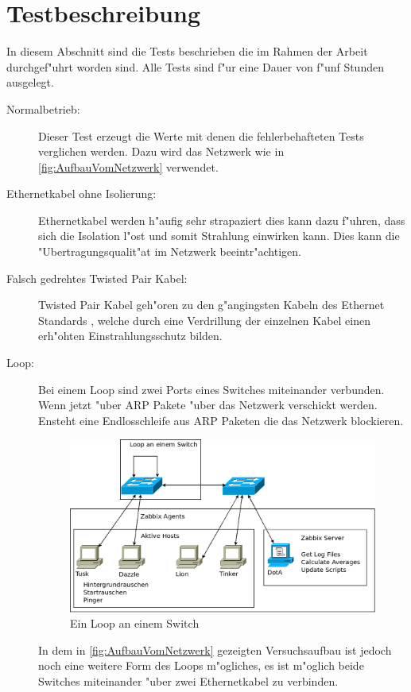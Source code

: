 \section{Testbeschreibung}
\label{sec:testbeschreibung}
In diesem Abschnitt sind die Tests beschrieben die im Rahmen der Arbeit durchgef"uhrt worden sind. %
Alle Tests sind f"ur eine Dauer von f"unf Stunden ausgelegt.  %
\begin{description}
\item[Normalbetrieb:]Dieser Test erzeugt die Werte mit denen die fehlerbehafteten %
Tests verglichen werden. Dazu wird das Netzwerk wie in \cref{fig:AufbauVomNetzwerk} %
verwendet. 
\item[Ethernetkabel ohne Isolierung:]Ethernetkabel werden h"aufig sehr strapaziert%
dies kann dazu f"uhren, dass sich die Isolation l"ost und somit Strahlung einwirken kann. %
Dies kann die "Ubertragungsqualit"at im Netzwerk beeintr"achtigen. 
\item[Falsch gedrehtes Twisted Pair Kabel:]Twisted Pair Kabel geh"oren zu den g"angingsten %
Kabeln des Ethernet Standards \autocite{book:CN2003}, welche durch eine Verdrillung der einzelnen Kabel %
einen erh"ohten Einstrahlungsschutz bilden. %
\item[Loop:]Bei einem Loop sind zwei Ports eines Switches miteinander verbunden. Wenn jetzt "uber ARP %
Pakete "uber das Netzwerk verschickt werden. Ensteht eine Endlosschleife aus ARP Paketen die das Netzwerk blockieren. %
\autocite{book:schreiner} %
\begin{figure}[htbp]
\centering
\includegraphics*[width=0.9\linewidth]{Abb/Versuche/Loop1Switch}
\caption{Ein Loop an einem Switch}
\label{fig:loop1switch}
\end{figure}
In dem in \cref{fig:AufbauVomNetzwerk} gezeigten Versuchsaufbau ist jedoch noch eine weitere Form des Loops m"ogliches, %
es ist m"oglich beide Switches miteinander "uber zwei Ethernetkabel zu verbinden. %

\end{description}
